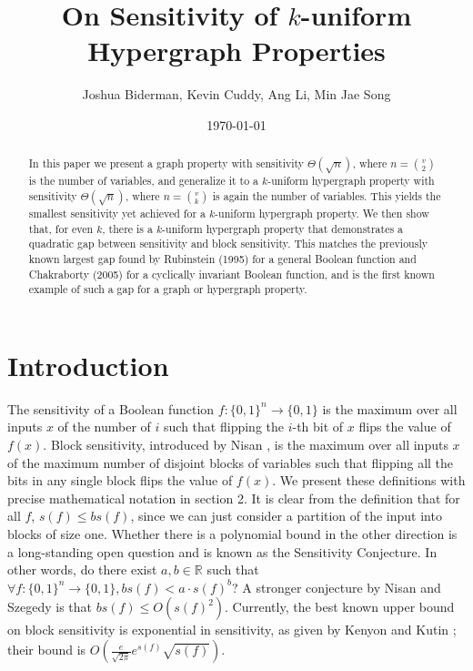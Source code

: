 \documentclass[psamsfonts]{amsart}
\theoremstyle{definition}
\theoremstyle{remark}
\numberwithin{equation}{section}
\begin{document}
	\title{On Sensitivity of $k$-uniform Hypergraph Properties}

	\author{Joshua Biderman, Kevin Cuddy, Ang Li, Min Jae Song}
	\date{\today}
	\begin{abstract}
		 In this paper we present a graph property with sensitivity $\Theta(\sqrt{n})$, where $n={v\choose2}$ is the number of variables, and generalize it to a $k$-uniform hypergraph property with sensitivity $\Theta(\sqrt{n})$, where $n={v\choose k}$ is again the number of variables. This yields the smallest sensitivity yet achieved for a $k$-uniform hypergraph property. We then show that, for even $k$, there is a $k$-uniform hypergraph property that demonstrates a quadratic gap between sensitivity and block sensitivity. This matches the previously known largest gap found by Rubinstein (1995) for a general Boolean function and Chakraborty (2005) for a cyclically invariant Boolean function, and is the first known example of such a gap for a graph or hypergraph property.
	\end{abstract}
	\maketitle
	
	\tableofcontents
	
	\section{Introduction}
The sensitivity of a Boolean function $f: \{0,1\}^{n} \rightarrow \{0,1\}$ is the maximum over all inputs $x$ of the number of $i$ such that flipping the $i$-th bit of $x$ flips the value of $f(x)$. Block sensitivity, introduced by Nisan \cite{N}, is the maximum over all inputs $x$ of the maximum number of disjoint blocks of variables such that flipping all the bits in any single block flips the value of $f(x)$. We present these definitions with precise mathematical notation in section 2.  It is clear from the definition that for all $f$, $s(f) \leq bs(f)$, since we can just consider a partition of the input into blocks of size one.  Whether there is a polynomial bound in the other direction is a long-standing open question and is known as the Sensitivity Conjecture. In other words, do there exist $a,b\in\mathbb{R}$ such that $\forall f:\{0,1\}^n\to\{0,1\},  bs(f)<a\cdot s(f)^b$? A stronger conjecture by Nisan and Szegedy \cite{NS} is that $bs(f) \leq O(s(f)^{2})$. Currently, the best known upper bound on block sensitivity is exponential in sensitivity, as given by Kenyon and Kutin \cite{KK}; their bound is $O(\frac{e}{\sqrt{2\pi}}e^{s(f)}\sqrt{s(f)})$.
\end{document}

